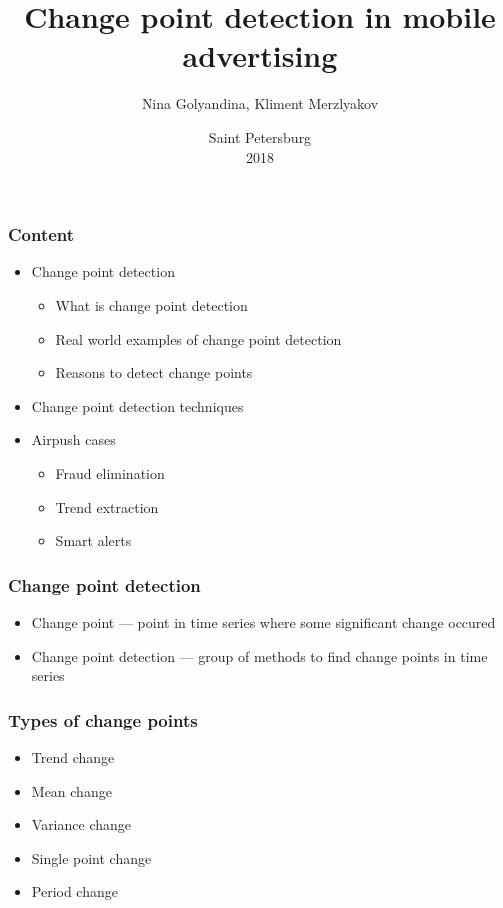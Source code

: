 \documentclass[intlimits, 9pt, unicode]{beamer}
\title{Change point detection in mobile advertising}
\author{Nina Golyandina, Kliment Merzlyakov}
\institute{Saint Petersburg State University \\
    Mathematical faculty \\
     Applied statistics department \\
}
\date{
    Saint Petersburg\\
    2018
}
\begin{document}
\begin{frame}
    \titlepage
\end{frame}

\begin{frame}
    \frametitle{Content}

    \begin{itemize}
    	\item Change point detection
		     	 \begin{itemize}
	    		   \item What is change point detection
		    	   \item Real world examples of change point detection 
		    	   \item Reasons to detect change points
		    	  \end{itemize}
        \item Change point detection techniques
        \item Airpush cases
		     	 \begin{itemize}
	    		   \item Fraud elimination
		    	   \item Trend extraction
		    	   \item Smart alerts
		    	  \end{itemize}
    \end{itemize}
\end{frame}


\begin{frame}
    \frametitle{Change point detection}

    \begin{itemize}
    	\item Change point --- point in time series where some significant change occured
	\item Change point detection --- group of methods to find change points in time series
    \end{itemize}
\end{frame}

\begin{frame}
    \frametitle{Types of change points}

    \begin{itemize}
    	\item Trend change
	\item Mean change
	\item Variance change
	\item Single point change
	\item Period change
    \end{itemize}
\end{frame}
\end{document}
